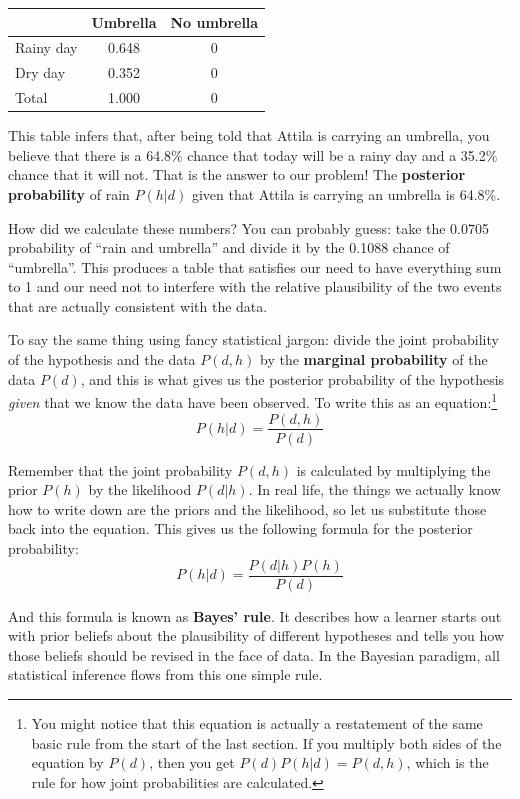 \documentclass[
]{book}
\theoremstyle{definition}
\theoremstyle{definition}
\theoremstyle{definition}
\theoremstyle{definition}
\theoremstyle{remark}
\begin{document}
\begin{longtable}[]{@{}lcc@{}}
\toprule()
& Umbrella & No umbrella \\
\midrule()
\endhead
Rainy day & 0.648 & 0 \\
Dry day & 0.352 & 0 \\
Total & 1.000 & 0 \\
\bottomrule()
\end{longtable}

This table infers that, after being told that Attila is carrying an umbrella, you believe that there is a 64.8\% chance that today will be a rainy day and a 35.2\% chance that it will not. That is the answer to our problem! The \textbf{posterior probability} of rain \(P(h|d)\) given that Attila is carrying an umbrella is 64.8\%.

How did we calculate these numbers? You can probably guess: take the 0.0705 probability of ``rain and umbrella'' and divide it by the 0.1088 chance of ``umbrella''. This produces a table that satisfies our need to have everything sum to 1 and our need not to interfere with the relative plausibility of the two events that are actually consistent with the data.

To say the same thing using fancy statistical jargon: divide the joint probability of the hypothesis and the data \(P(d,h)\) by the \textbf{marginal probability} of the data \(P(d)\), and this is what gives us the posterior probability of the hypothesis \emph{given} that we know the data have been observed. To write this as an equation:\footnote{You might notice that this equation is actually a restatement of the same basic rule from the start of the last section. If you multiply both sides of the equation by \(P(d)\), then you get \(P(d) P(h| d) = P(d,h)\), which is the rule for how joint probabilities are calculated.}
\[
P(h | d) = \frac{P(d,h)}{P(d)}
\]

Remember that the joint probability \(P(d,h)\) is calculated by multiplying the prior \(P(h)\) by the likelihood \(P(d|h)\). In real life, the things we actually know how to write down are the priors and the likelihood, so let us substitute those back into the equation. This gives us the following formula for the posterior probability:
\[
P(h | d) = \frac{P(d|h) P(h)}{P(d)}
\]

And this formula is known as \textbf{Bayes' rule}. It describes how a learner starts out with prior beliefs about the plausibility of different hypotheses and tells you how those beliefs should be revised in the face of data. In the Bayesian paradigm, all statistical inference flows from this one simple rule.
\end{document}
